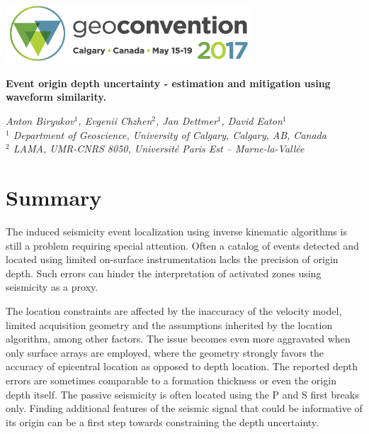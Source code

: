 \documentclass[letterpaper,11pt]{article}
\begin{document}
\begin{center}
\includegraphics[width=9.22cm]{header.png} \vspace{-1pt}
\end{center}

\begin{flushleft}
{\LARGE
\begin{spacing}{0.9}
\textbf{Event origin depth uncertainty - estimation and mitigation using waveform similarity.}
\end{spacing}
}

\textit{Anton Biryukov${}^1$, Evgenii Chzhen${}^2$, Jan Dettmer${}^1$, David Eaton${}^1$} \\
\textit{${}^1$ Department of Geoscience, University of Calgary, Calgary, AB, Canada} \\
\textit{${}^2$ LAMA, UMR-CNRS 8050, Universit\'{e} Paris Est -- Marne-la-Vall\'{e}e}
\end{flushleft}

\section*{Summary}
%
The induced seismicity event localization using inverse kinematic algorithms is still a problem requiring special attention. Often a catalog of events detected and located using limited on-surface instrumentation lacks the precision of origin depth. Such errors can hinder the interpretation of activated zones using seismicity as a proxy.

The location constraints are affected by the inaccuracy of the velocity model, limited acquisition geometry and the assumptions inherited by the location algorithm, among other factors. The issue becomes even more aggravated when only surface arrays are employed, where the geometry strongly favors the accuracy of epicentral location as opposed to depth location. The reported depth errors are sometimes comparable to a formation thickness or even the origin depth itself. The passive seismicity is often located using the P and S first breaks only. Finding additional features of the seismic signal that could be informative of its origin can be a first step towards constraining the depth uncertainty. 
\end{document}
